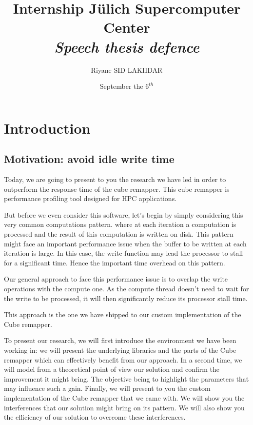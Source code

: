 \documentclass[12pt]{article}											%
\title
{
	Internship Jülich Supercomputer Center\\
	\emph{Speech thesis defence}
}
\author{Riyane SID-LAKHDAR}
\date{September the $6^{th}$}
\begin{document}
\maketitle

\begin{abstract}
\end{abstract}

\tableofcontents
\newpage



\section{Introduction}
\subsection{Motivation: avoid idle write time}
	Today, we are going to present to you the research we have led in order to outperform the response time of the cube remapper.   This cube remapper is performance profiling tool designed for HPC applications.

	But before we even consider this software, let's begin by simply considering this very common computations pattern. where at each iteration a computation is processed and the result of this computation is written on disk.
	This pattern might face an important performance issue when the buffer to be written at each iteration is large.   In this case, the write function may lead the processor to stall for a significant time.   Hence the important time overhead on this pattern.

	Our general approach to face this performance issue is to overlap the write operations with the compute one.   As the compute thread doesn't need to wait for the write to be processed, it will then significantly reduce its processor stall time.

	This approach is the one we have shipped to our custom implementation of the Cube remapper.

	To present our research, we will first introduce the environment we have been working in:  we will present the underlying libraries and the parts of the Cube remapper which can effectively benefit from our approach.
	In a second time, we will model from a theoretical point of view our solution and confirm the improvement it might bring.   The objective being to highlight the parameters that may influence such a gain.
	Finally, we will present to you the custom implementation of the Cube remapper that we came with.   We will show you the interferences that our solution might bring on its pattern.   We will also show you the efficiency of our solution to overcome these interferences.
\end{document}
